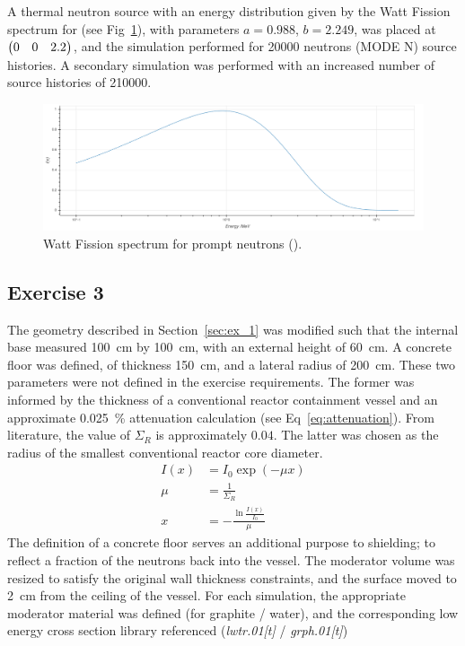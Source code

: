 \documentclass{article}
\begin{document}
    A thermal neutron source with an energy distribution given by the Watt Fission spectrum for  (see Fig~\ref{fig:watt_fission}), with parameters $a=0.988$, $b=2.249$, was placed at $\mqty(0 & 0 & 2.2)$, and the simulation performed for \num{20000} neutrons (MODE N) source histories. A secondary simulation was performed with an increased number of source histories of \num{210000}.
    \begin{figure}[htb]
      \centering
      \includegraphics[width=\textwidth]{watt_spectrum_235_u.png}
      \caption{Watt Fission spectrum for prompt neutrons ().} %
      \label{fig:watt_fission}
    \end{figure}

  \subsection{Exercise 3}
    The geometry described in Section~\ref{sec:ex_1} was modified such that the internal base measured \SI{100}{\cm} by \SI{100}{\cm}, with an external height of \SI{60}{\cm}.
    A concrete floor was defined, of thickness \SI{150}{\cm}, and a lateral radius of \SI{200}{\cm}. These two parameters were not defined in the exercise requirements. The former was informed by the thickness of a conventional reactor containment vessel\cite{nuclear_reactors} and an approximate \SI{0.025}{\percent} attenuation calculation (see Eq~\ref{eq:attenuation}). From literature, the value of $\Sigma_R$ is approximately $0.04$\cite{neutrons}. The latter was chosen as the radius of the smallest conventional reactor core diameter. %
    \begin{align}
      \label{eq:attenuation}
      I(x)&=I_0\exp(-\mu x) \\
      \mu &= \frac{1}{\Sigma_R}\\
      x &= -\frac{\ln{\frac{I(x)}{I_0}}}{\mu}
    \end{align}
    The definition of a concrete floor serves an additional purpose to shielding; to reflect a fraction of the neutrons back into the vessel.
    The moderator volume was resized to satisfy the original wall thickness constraints, and the surface moved to \SI{2}{\cm} from the ceiling of the vessel. For each simulation, the appropriate moderator material was defined (for graphite / water), and the corresponding low energy cross section library referenced (\textit{lwtr.01[t]} / \textit{grph.01[t]})
\end{document}

